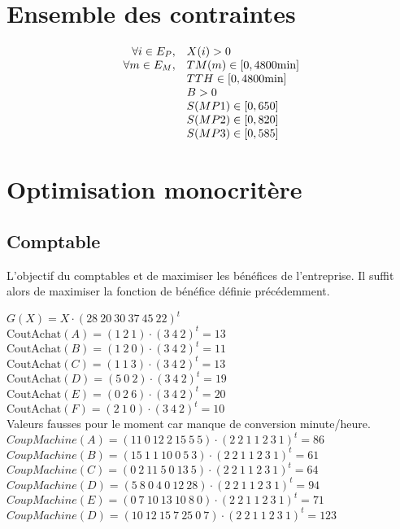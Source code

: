\documentclass[a4paper, 11pt]{article}
\begin{document}
\section{Ensemble des contraintes}
$$
\begin{array}{r l}
    \forall i\in E_P, & X(i) > 0 \\
    \forall m\in E_M, & TM(m) \in [0, 4800\mbox{min}] \\
                      & TTH \in [0, 4800\mbox{min}] \\
                      & B > 0 \\
                      & S(MP1) \in [0, 650] \\
                      & S(MP2) \in [0, 820] \\
                      & S(MP3) \in [0, 585] \\
\end{array}
$$

\section{Optimisation monocritère}
\subsection{Comptable}
L'objectif du comptables et de maximiser les bénéfices de l'entreprise.
Il suffit alors de maximiser la fonction de bénéfice définie précédemment.

$G(X) = X\cdot(28~20~30~37~45~22)^t$ \\

$\mbox{CoutAchat}(A) = (1~2~1)\cdot(3~4~2)^t = 13$ \\
$\mbox{CoutAchat}(B) = (1~2~0)\cdot(3~4~2)^t = 11$ \\
$\mbox{CoutAchat}(C) = (1~1~3)\cdot(3~4~2)^t = 13$ \\
$\mbox{CoutAchat}(D) = (5~0~2)\cdot(3~4~2)^t = 19$ \\
$\mbox{CoutAchat}(E) = (0~2~6)\cdot(3~4~2)^t = 20$ \\
$\mbox{CoutAchat}(F) = (2~1~0)\cdot(3~4~2)^t = 10$ \\

Valeurs fausses pour le moment car manque de conversion minute/heure. \\
$CoupMachine(A) = (11~0~12~2~15~5~5)\cdot(2~2~1~1~2~3~1)^t = 86$ \\
$CoupMachine(B) = (15~1~1~10~0~5~3)\cdot(2~2~1~1~2~3~1)^t = 61$ \\
$CoupMachine(C) = (0~2~11~5~0~13~5)\cdot(2~2~1~1~2~3~1)^t = 64$ \\
$CoupMachine(D) = (5~8~0~4~0~12~28)\cdot(2~2~1~1~2~3~1)^t = 94$ \\
$CoupMachine(E) = (0~7~10~13~10~8~0)\cdot(2~2~1~1~2~3~1)^t = 71$ \\
$CoupMachine(D) = (10~12~15~7~25~0~7)\cdot(2~2~1~1~2~3~1)^t = 123$ \\
\end{document}
